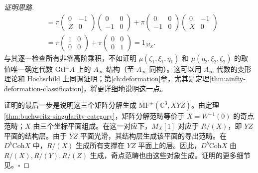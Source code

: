 \begin{proof}[证明思路]
\[\begin{aligned}
  &=\pi\begin{pmatrix}0&-1\\Z&0\end{pmatrix}
    \begin{pmatrix}0&0\\-1&0\end{pmatrix}
   +\pi\begin{pmatrix}0&0\\-1&0\end{pmatrix}
             \begin{pmatrix}0&-1\\X&0\end{pmatrix}\\
  &=\pi\begin{pmatrix}1&0\\0&0\end{pmatrix}
   +\pi\begin{pmatrix}0&0\\0&1\end{pmatrix}=1_{M_X}.
\end{aligned}
\]
与其逐一检查所有非零高阶乘积，不如证明 $\mu(\zeta_1,\xi_1,\eta_1)$ 和 $\mu(\eta_2,\xi_2,\zeta_2)$ 的取值唯一确定代数 $\mathrm{Gtl}^{\pm}A$ 上的 $A_\infty$ 结构（至 $A_\infty$ 同构）。这可以用 $A_\infty$ 代数的变形理论和 Hochschild 上同调证明；第\ref{ch:deformation}章，尤其是定理\ref{thm:ainfty-deformation-classification}，将更详细地说明这一点。

证明的最后一步是说明这三个矩阵分解生成 $\mathrm{MF}^{\pm}(\mathbb C^3,XYZ)$。由定理\ref{thm:buchweitz-singularity-category}，矩阵分解范畴等价于 $X=W^{-1}(0)$ 的奇点范畴；$X$ 由三个坐标平面组成。在这一对应下，$M_X[1]$ 对应于 $R/(X)$，即 $YZ$ 平面的结构层。由于 $YZ$ 平面光滑，其结构层生成该平面的导出范畴。在 $D^b\mathrm{Coh}X$ 中，$R/(X)$ 生成所有支撑在 $YZ$ 平面上的层。因此，$D^b\mathrm{Coh}X$ 由 $R/(X),R/(Y),R/(Z)$ 生成，奇点范畴也由这些对象生成。证明的更多细节见。\hfill$\square$
\end{proof}

